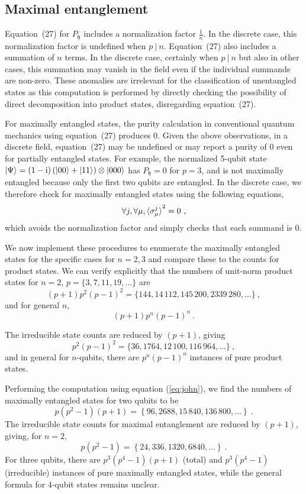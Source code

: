 \documentclass[12pt]{iopart}
\def\fh{\mathfrak{h}}
\begin{document}
\subsection{Maximal entanglement}

Equation~(27) for $P_{\fh}$ includes a normalization factor $\frac{1}{n}$. In the discrete case, this normalization factor is undefined when $p ~|~ n$. Equation~(27) also includes a summation of $n$ terms. In the discrete case, certainly when $p ~|~ n$ but also in other cases, this summation may vanish in the field even if the individual summands are non-zero. These anomalies are irrelevant for the classification of unentangled states as this computation is performed by directly checking the possibility of direct decomposition into product states, disregarding equation~(27). 

For maximally entangled states, the purity calculation in conventional quantum mechanics using equation~(27) produces 0. Given the above observations, in a discrete field, equation~(27) may be undefined or may report a purity of 0 even for partially entangled states. For example, the normalized 5-qubit state $\ket{\Psi}=\left(1-\mathrm{i}\right)\left(\ket{00}+\ket{11}\right)\otimes\ket{000}$ has $P_{\fh}=0$ for $p=3$, and is not maximally entangled because only the first two qubits are entangled. In the discrete case, we therefore check for maximally entangled states using the following equations,
\begin{equation}
\forall j,\forall\mu,\braket{\sigma_{\mu}^{j}}^2 =0\textrm{ ,}\label{eq:john}
\end{equation}
which avoids the normalization factor and simply checks that each summand is 0. 

We now implement these procedures to enumerate the maximally entangled states for the specific cases for $n = 2 ,3 $ and compare these to the counts for product states. We can verify explicitly that the numbers of unit-norm product states for $n=2$,
$p=\{3,7,11,19,\ldots\}$ are  
\[
(p+1)p^{2}(p-1)^{2}=\{144,14\,112,145\,200,2339\,280,\ldots\}\ ,
\]
and for general $n$, \[(p+1)p^{n}(p-1)^{n}\ .\]

The irreducible state counts are reduced by $(p+1)$, giving 
\[
p^{2}(p-1)^{2}=\{36,1764,12\,100,116\,964,\ldots\}\ ,
\]
and in general for $n$-qubits, there are $p^{n}\left(p-1\right)^{n}$
instances of pure product states.

Performing the computation using equation (\ref{eq:john}), we find the numbers of maximally entangled states for two qubits to be 
\[
p\left(p^2-1\right)\left(p+1\right)=\left\{ 96,2688,15\,840,136\,800,\ldots\right\} \ .
\]
The irreducible state counts for maximal entanglement are reduced
by $\left(p+1\right)$, giving, for $n=2$, 
\[
p\left(p^{2}-1\right)=\left\{ 24,336,1320,6840,\ldots\right\} \ .
\]
For three qubits, there are $p^{3}\left(p^{4}-1\right)\left(p+1\right)$ (total) and $p^{3}\left(p^{4}-1\right)$ (irreducible) instances of pure maximally entangled states, while the general formula for 4-qubit states remains unclear.
\end{document}
